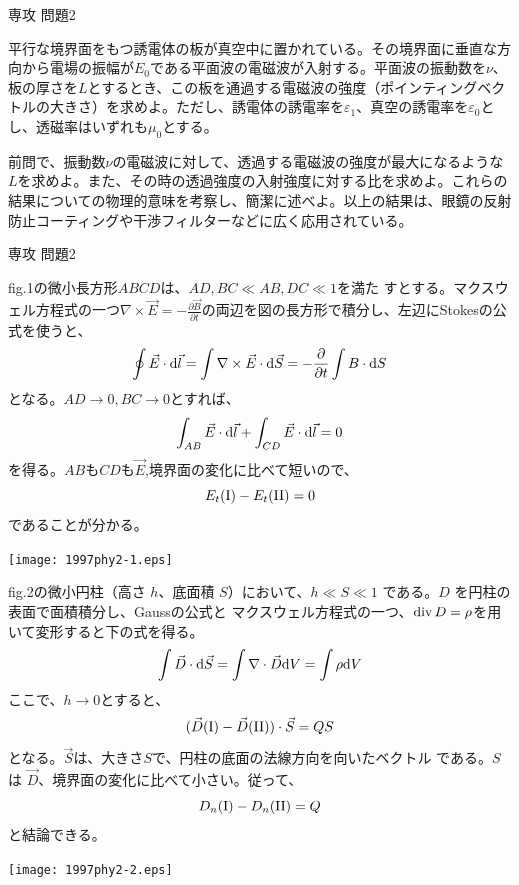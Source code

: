 \documentclass[fleqn]{jbook}
\begin{document}
\begin{question}{専攻 問題2}{}
\begin{subquestions}
\SubQuestion
平行な境界面をもつ誘電体の板が真空中に置かれている。その境界面に垂直な方向から電場の振幅が$E_0$である平面波の電磁波が入射する。平面波の振動数を$\nu$、板の厚さを$L$とするとき、この板を通過する電磁波の強度（ポインティングベクトルの大きさ）を求めよ。ただし、誘電体の誘電率を$\varepsilon_1$、真空の誘電率を$\varepsilon_0$とし、透磁率はいずれも$\mu_0$とする。

\SubQuestion
前問で、振動数$\nu$の電磁波に対して、透過する電磁波の強度が最大になるような$L$を求めよ。また、その時の透過強度の入射強度に対する比を求めよ。これらの結果についての物理的意味を考察し、簡潔に述べよ。以上の結果は、眼鏡の反射防止コーティングや干渉フィルターなどに広く応用されている。
\end{subquestions}
\end{question}
\begin{answer}{専攻 問題2}{}

\begin{subanswers}
\SubAnswer

\parbox[t]{100mm}{fig.1の微小長方形$ABCD$は、$AD,BC \ll AB,DC \ll 1 $を満た
すとする。マクスウェル方程式の一つ$\nabla\times \vec{E}=-\frac{\partial {\vec{B}}}{\partial t}$の両辺を図の長方形で積分し、左辺にStokesの公式を使うと、
\[\oint \vec{E} \cdot {\rm{d}}  {\vec{l}} = \int\nabla\times \vec{E}\cdot {\rm{d}} {\vec{S}} = -\frac{\partial}{\partial t}\int B\cdot {\rm{d}} S \]
となる。$AD \rightarrow 0, BC \rightarrow 0 $とすれば、
\[ \int_{AB} \vec{E}\cdot {\rm{d}}\vec{l} + \int_{CD} \vec{E}\cdot {\rm{d}}\vec{l} = 0 \]
を得る。$AB$も$CD$も$ \vec{E}$,境界面の変化に比べて短いので、
\[ E_t({\rm{I}})- E_t({\rm{II}})=0 \]
であることが分かる。}\parbox[t]{60mm}{\vspace*{-10mm}
\begin{center}
\texttt{[image: 1997phy2-1.eps]}
\end{center}
}

\SubAnswer
\parbox[t]{100mm}{
fig.2の微小円柱（高さ $h$、底面積 $S$）において、$h \ll S \ll 1 $
である。$ D$ を円柱の表面で面積積分し、Gaussの公式と
マクスウェル方程式の一つ、${\rm div\,}D=\rho$を用いて変形すると下の式を得る。
\[\int {\vec{D}}\cdot {\rm{d}} {\vec{S}} = \int\nabla\cdot {\vec{D}} {\rm{d}}V
                         = \int\rho {\rm{d}}V                 \]
ここで、$h\rightarrow 0$とすると、
\[ ( {\vec{D}}({\rm{I}})- {\vec{D}}({\rm{II}}))\cdot \vec{S} = QS  \]
となる。$ {\vec{S}}$は、大きさ$S$で、円柱の底面の法線方向を向いたベクトル
である。$S$は $ {\vec{D}}$、境界面の変化に比べて小さい。従って、
\[  D_n({\rm{I}})-D_n({\rm{II}})=Q   \]
と結論できる。}\parbox[t]{60mm}{\vspace*{-10mm}
\begin{center}
\texttt{[image: 1997phy2-2.eps]}
\end{center}
}


\end{subanswers}
\end{answer}
\end{document}
